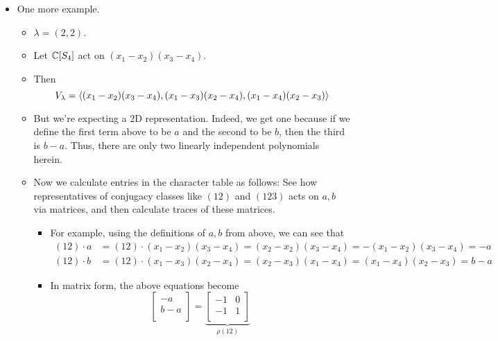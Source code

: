 \documentclass[../notes.tex]{subfiles}
\begin{document}
\begin{itemize}
    \item One more example.
    \begin{itemize}
        \item $\lambda=(2,2)$.
        \item Let $\mathbb{C}[S_4]$ act on $(x_1-x_2)(x_3-x_4)$.
        \item Then
        \begin{equation*}
            V_\lambda = \left\langle{(x_1-x_2)(x_3-x_4),(x_1-x_3)(x_2-x_4),(x_1-x_4)(x_2-x_3)}\right\rangle
        \end{equation*}
        \item But we're expecting a 2D representation. Indeed, we get one because if we define the first term above to be $a$ and the second to be $b$, then the third is $b-a$. Thus, there are only two linearly independent polynomials herein.
        \item Now we calculate entries in the character table as follows: See how representatives of conjugacy classes like $(12)$ and $(123)$ acts on $a,b$ via matrices, and then calculate traces of these matrices.
        \begin{itemize}
            \item For example, using the definitions of $a,b$ from above, we can see that
            \begin{align*}
                (12)\cdot a &= (12)\cdot(x_1-x_2)(x_3-x_4)
                    = (x_2-x_2)(x_3-x_4)
                    = -(x_1-x_2)(x_3-x_4)
                    = -a\\
                (12)\cdot b &= (12)\cdot(x_1-x_3)(x_2-x_4)
                    = (x_2-x_3)(x_1-x_4)
                    = (x_1-x_4)(x_2-x_3)
                    = b-a
            \end{align*}
            \item In matrix form, the above equations become
            \begin{equation*}
                \begin{bmatrix}
                    -a\\
                    b-a\\
                \end{bmatrix}
                = \underbrace{
                    \begin{bmatrix}
                        -1 & 0\\
                        -1 & 1\\
                    \end{bmatrix}
                }_{\rho(12)}

\end{equation*}
\end{itemize}
\end{itemize}
\end{itemize}
\end{document}
